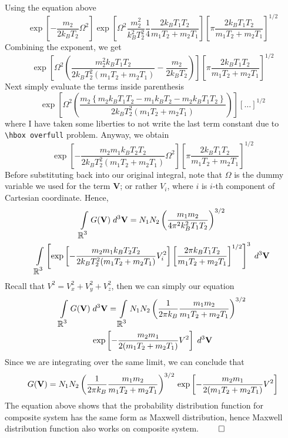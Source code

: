\documentclass[../../../Main.tex]{subfiles}
\begin{document}
Using the equation above
\begin{equation*}
    \exp\left[-\frac{m_2}{2k_BT_2}\Omega^2\right] \exp \left[\Omega^2\frac{m_2^2}{k_B^2T_2^2}\frac{1}{4}\frac{2k_BT_1T_2}{m_1T_2+ m_2T_1}\right]\left[\pi\frac{2k_BT_1T_2}{m_1T_2+ m_2T_1}\right]^{1/2}
\end{equation*}
Combining the exponent, we get 
\begin{equation*}
     \exp \left[\Omega^2 \left(\frac{m_2^2k_BT_1T_2}{2k_B T_2^2 (m_1T_2+ m_2T_1)}- \frac{m_2}{2k_BT_2}\right)\right] \left[\pi\frac{2k_BT_1T_2}{m_1T_2+ m_2T_1}\right]^{1/2}
\end{equation*}
Next simply evaluate the terms inside parenthesis 
\begin{equation*}
    \exp \left[\Omega^2 \left(\frac{m_2\left\{m_2k_BT_1T_2-m_1k_BT_2-m_2k_BT_1T_2\right\}}{2k_B T_2^2 (m_1T_2+ m_2T_1)}\right)\right] \left[\dots\right]^{1/2}
\end{equation*}
where I have taken some liberties to not write the last term constant due to \verb|\hbox overfull| problem. Anyway, we obtain
\begin{equation*}
    \exp \left[-\frac{m_2m_1k_BT_2T_2}{2k_B T_2^2 (m_1T_2+ m_2T_1)} \Omega^2 \right] \left[\pi\frac{2k_BT_1T_2}{m_1T_2+ m_2T_1}\right]^{1/2}
\end{equation*}
Before substituting back into our original integral, note that $\Omega$ is the dummy variable we used for the term $\mathbf{V}$; or rather $V_i$, where $i$ is $i$-th component of Cartesian coordinate. Hence,
\begin{multline*}
    \int\displaylimits_{\displaystyle\mathbb{R}^3} G(\mathbf{V}) \; d^3\mathbf{V} =N_1 N_2 \left(\frac{m_1 m_2}{4\pi^2 k_B^2 T_1 T_2}\right)^{3/2} \\
    \int\displaylimits_{\displaystyle\mathbb{R}^3} \left[  \exp \left[-\frac{m_2m_1k_BT_2T_2}{2k_B T_2^2 (m_1T_2+ m_2T_1)} V_i^2 \right] \left[\frac{2\pi k_BT_1T_2}{m_1T_2+ m_2T_1}\right]^{1/2}\right]^3\;d^3\mathbf{V}
\end{multline*}
Recall that $V^2=V_x^2+V_y^2+V_z^2$, then we can simply our equation
\begin{multline*}
    \int\displaylimits_{\displaystyle\mathbb{R}^3} G(\mathbf{V}) \; d^3\mathbf{V} 
    =\int\displaylimits_{\displaystyle\mathbb{R}^3}N_1 N_2 \left(\frac{1}{2\pi k_B}\frac{m_1m_2}{m_1T_2+ m_2T_1}\right)^{3/2}\\
    \exp \left[-\frac{m_2m_1}{2 (m_1T_2+ m_2T_1)} V^2\right] \;d^3\mathbf{V}
\end{multline*}
Since we are integrating over the same limit, we can conclude that 
\begin{equation*}
    G(\mathbf{V})= N_1 N_2 \left(\frac{1}{2\pi k_B}\frac{m_1m_2}{m_1T_2+ m_2T_1}\right)^{3/2}\\
    \exp \left[-\frac{m_2m_1}{2 (m_1T_2+ m_2T_1)} V^2\right] 
\end{equation*} 
The equation above shows that the probability distribution function for composite system has the same form as Maxwell distribution, hence Maxwell distribution function also works on composite system. $\qed$
\end{document}
